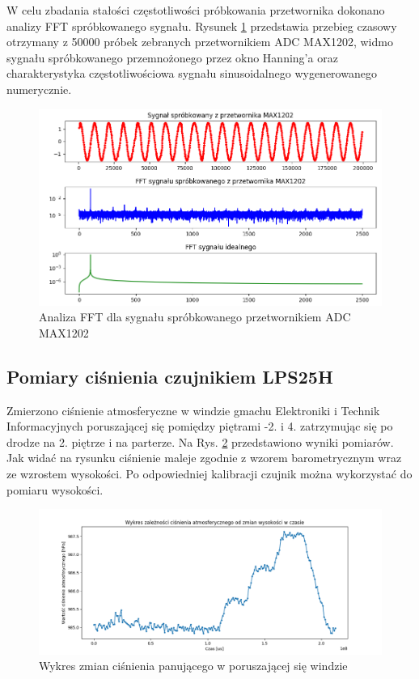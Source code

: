 W celu zbadania stałości częstotliwości próbkowania przetwornika dokonano analizy FFT spróbkowanego sygnału. Rysunek \ref{fig:sin_fft_max1202} przedstawia przebieg czasowy otrzymany z 50000 próbek zebranych przetwornikiem ADC MAX1202, widmo sygnału spróbkowanego przemnożonego przez okno Hanning'a oraz charakterystyka częstotliwościowa sygnału sinusoidalnego wygenerowanego numerycznie.


\begin{figure}[H]
		\includegraphics[width=14cm]{sin_fft_max1202}
	\caption{Analiza FFT dla sygnału spróbkowanego przetwornikiem ADC MAX1202} 
	\label{fig:sin_fft_max1202}
\end{figure}

\subsection{Pomiary ciśnienia czujnikiem LPS25H}

Zmierzono ciśnienie atmosferyczne w windzie gmachu Elektroniki i Technik Informacyjnych poruszającej się pomiędzy piętrami -2. i 4. zatrzymując się po drodze na 2. piętrze i na parterze. Na Rys. \ref{fig:winda} przedstawiono wyniki pomiarów. Jak widać na rysunku ciśnienie maleje zgodnie z wzorem barometrycznym wraz ze wzrostem wysokości. Po odpowiedniej kalibracji czujnik można wykorzystać do pomiaru wysokości.


\begin{figure}[H]
	\centering
		\includegraphics[width=14cm]{winda}
	\caption{Wykres zmian ciśnienia panującego w poruszającej się windzie} 
	\label{fig:winda}
\end{figure}


